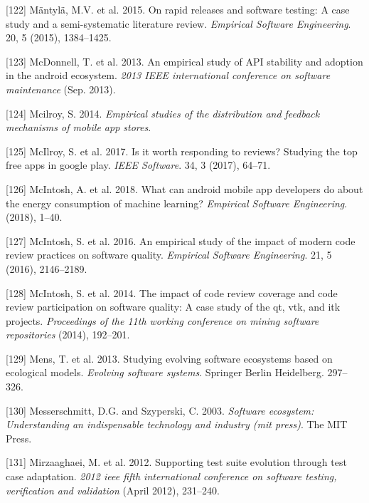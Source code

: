 \documentclass[]{book}
\begin{document}
\hypertarget{ref-mantyla2015a}{}
{[}122{]} Mäntylä, M.V. et al. 2015. On rapid releases and software
testing: A case study and a semi-systematic literature review.
\emph{Empirical Software Engineering}. 20, 5 (2015), 1384--1425.

\hypertarget{ref-McDonnell2013}{}
{[}123{]} McDonnell, T. et al. 2013. An empirical study of API stability
and adoption in the android ecosystem. \emph{2013 IEEE international
conference on software maintenance} (Sep. 2013).

\hypertarget{ref-mcilroy2014empirical}{}
{[}124{]} Mcilroy, S. 2014. \emph{Empirical studies of the distribution
and feedback mechanisms of mobile app stores}.

\hypertarget{ref-mcilroy2017worth}{}
{[}125{]} McIlroy, S. et al. 2017. Is it worth responding to reviews?
Studying the top free apps in google play. \emph{IEEE Software}. 34, 3
(2017), 64--71.

\hypertarget{ref-MSA2018}{}
{[}126{]} McIntosh, A. et al. 2018. What can android mobile app
developers do about the energy consumption of machine learning?
\emph{Empirical Software Engineering}. (2018), 1--40.

\hypertarget{ref-mcintosh2016empirical}{}
{[}127{]} McIntosh, S. et al. 2016. An empirical study of the impact of
modern code review practices on software quality. \emph{Empirical
Software Engineering}. 21, 5 (2016), 2146--2189.

\hypertarget{ref-mcintosh2014impact}{}
{[}128{]} McIntosh, S. et al. 2014. The impact of code review coverage
and code review participation on software quality: A case study of the
qt, vtk, and itk projects. \emph{Proceedings of the 11th working
conference on mining software repositories} (2014), 192--201.

\hypertarget{ref-Mens2013}{}
{[}129{]} Mens, T. et al. 2013. Studying evolving software ecosystems
based on ecological models. \emph{Evolving software systems}. Springer
Berlin Heidelberg. 297--326.

\hypertarget{ref-Messerschmitt2003}{}
{[}130{]} Messerschmitt, D.G. and Szyperski, C. 2003. \emph{Software
ecosystem: Understanding an indispensable technology and industry (mit
press)}. The MIT Press.

\hypertarget{ref-supportingtestsuite}{}
{[}131{]} Mirzaaghaei, M. et al. 2012. Supporting test suite evolution
through test case adaptation. \emph{2012 ieee fifth international
conference on software testing, verification and validation} (April
2012), 231--240.
\end{document}
